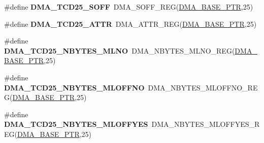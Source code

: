 \begin{DoxyCompactItemize}
\item 
\hypertarget{group___d_m_a___register___accessor___macros_gaad3737db3d37bc5569f31ee808e2304c}{}\#define {\bfseries D\+M\+A\+\_\+\+T\+C\+D25\+\_\+\+S\+O\+F\+F}~D\+M\+A\+\_\+\+S\+O\+F\+F\+\_\+\+R\+E\+G(\hyperlink{group___d_m_a___peripheral_ga6997fbc1b1973e9f27170217a3bd6f22}{D\+M\+A\+\_\+\+B\+A\+S\+E\+\_\+\+P\+T\+R},25)\label{group___d_m_a___register___accessor___macros_gaad3737db3d37bc5569f31ee808e2304c}

\item 
\hypertarget{group___d_m_a___register___accessor___macros_gad82982a53647b7096f0c89a709611775}{}\#define {\bfseries D\+M\+A\+\_\+\+T\+C\+D25\+\_\+\+A\+T\+T\+R}~D\+M\+A\+\_\+\+A\+T\+T\+R\+\_\+\+R\+E\+G(\hyperlink{group___d_m_a___peripheral_ga6997fbc1b1973e9f27170217a3bd6f22}{D\+M\+A\+\_\+\+B\+A\+S\+E\+\_\+\+P\+T\+R},25)\label{group___d_m_a___register___accessor___macros_gad82982a53647b7096f0c89a709611775}

\item 
\hypertarget{group___d_m_a___register___accessor___macros_gaca73bfae4c774aa7f125725a453c9d01}{}\#define {\bfseries D\+M\+A\+\_\+\+T\+C\+D25\+\_\+\+N\+B\+Y\+T\+E\+S\+\_\+\+M\+L\+N\+O}~D\+M\+A\+\_\+\+N\+B\+Y\+T\+E\+S\+\_\+\+M\+L\+N\+O\+\_\+\+R\+E\+G(\hyperlink{group___d_m_a___peripheral_ga6997fbc1b1973e9f27170217a3bd6f22}{D\+M\+A\+\_\+\+B\+A\+S\+E\+\_\+\+P\+T\+R},25)\label{group___d_m_a___register___accessor___macros_gaca73bfae4c774aa7f125725a453c9d01}

\item 
\hypertarget{group___d_m_a___register___accessor___macros_gae7919a4fe6373312939072a40f2f06eb}{}\#define {\bfseries D\+M\+A\+\_\+\+T\+C\+D25\+\_\+\+N\+B\+Y\+T\+E\+S\+\_\+\+M\+L\+O\+F\+F\+N\+O}~D\+M\+A\+\_\+\+N\+B\+Y\+T\+E\+S\+\_\+\+M\+L\+O\+F\+F\+N\+O\+\_\+\+R\+E\+G(\hyperlink{group___d_m_a___peripheral_ga6997fbc1b1973e9f27170217a3bd6f22}{D\+M\+A\+\_\+\+B\+A\+S\+E\+\_\+\+P\+T\+R},25)\label{group___d_m_a___register___accessor___macros_gae7919a4fe6373312939072a40f2f06eb}

\item 
\hypertarget{group___d_m_a___register___accessor___macros_gabaf17ef265d11111c2f36e488cddf324}{}\#define {\bfseries D\+M\+A\+\_\+\+T\+C\+D25\+\_\+\+N\+B\+Y\+T\+E\+S\+\_\+\+M\+L\+O\+F\+F\+Y\+E\+S}~D\+M\+A\+\_\+\+N\+B\+Y\+T\+E\+S\+\_\+\+M\+L\+O\+F\+F\+Y\+E\+S\+\_\+\+R\+E\+G(\hyperlink{group___d_m_a___peripheral_ga6997fbc1b1973e9f27170217a3bd6f22}{D\+M\+A\+\_\+\+B\+A\+S\+E\+\_\+\+P\+T\+R},25)\label{group___d_m_a___register___accessor___macros_gabaf17ef265d11111c2f36e488cddf324}


\end{DoxyCompactItemize}
